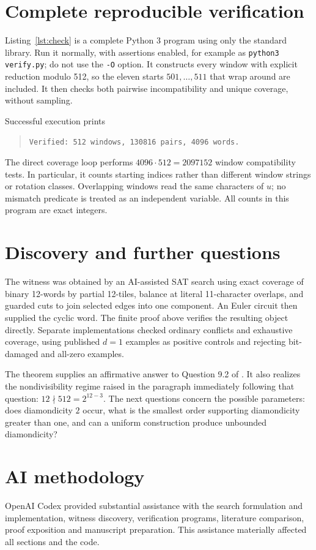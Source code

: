 \documentclass[acmsmall,nonacm,11pt,natbib=false]{acmart}
\begin{document}
\clearpage
\section{Complete reproducible verification}

Listing~\ref{lst:check} is a complete Python 3 program using only the
standard library. Run it normally, with assertions enabled, for example
as \texttt{python3 verify.py}; do not use the \texttt{-O} option. It
constructs every window with explicit reduction modulo 512, so the eleven
starts $501,\ldots,511$ that wrap around are included. It then checks
both pairwise incompatibility and unique coverage, without sampling.



Successful execution prints
\begin{quote}
\texttt{Verified: 512 windows, 130816 pairs, 4096 words.}
\end{quote}
The direct coverage loop performs $4096\cdot512=2097152$ window
compatibility tests. In particular, it counts starting indices rather
than different window strings or rotation classes. Overlapping windows
read the same characters of $u$; no mismatch predicate is treated as an
independent variable. All counts in this program are exact integers.

\section{Discovery and further questions}

The witness was obtained by an AI-assisted SAT search using exact coverage of
binary 12-words by partial 12-tiles, balance at literal 11-character
overlaps, and guarded cuts to join selected edges into one component.
An Euler circuit then supplied the cyclic word. The finite proof above
verifies the resulting object directly. Separate implementations checked
ordinary conflicts and exhaustive coverage, using published $d=1$ examples
as positive controls and rejecting bit-damaged and all-zero examples.

The theorem supplies an affirmative answer to Question 9.2 of
\cite{FGKMM26}. It also realizes the nondivisibility regime raised in the
paragraph immediately following that question: $12\nmid512=2^{12-3}$.
The next questions concern the possible parameters: does diamondicity
$2$ occur, what is the smallest order supporting diamondicity greater
than one, and can a uniform construction produce unbounded diamondicity?

\section*{AI methodology}

OpenAI Codex provided substantial assistance with the search
formulation and implementation, witness discovery, verification programs,
literature comparison, proof exposition and manuscript preparation.
This assistance materially affected all sections and the code.



\end{document}
